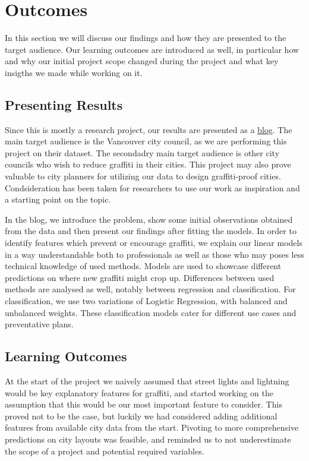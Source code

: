 \chapter{Outcomes}
In this section we will discuss our findings and how they are presented to the target audience. Our learning outcomes are introduced as well, in particular how and why our initial project scope changed during the project and what key insigths we made while working on it.

\section{Presenting Results}

Since this is mostly a research project, our results are presented as a \href{https://cowkeyman.github.io/PredictingGraffitiUsingCityLayouts/}{blog}. The main target audience is the Vancouver city council, as we are performing this project on their dataset. The secondadry main target audience is other city councils who wish to reduce graffiti in their cities. This project may also prove valuable to city planners for utilizing our data to design graffiti-proof cities. Condsideration has been taken for researchers to use our work as inspiration and a starting point on the topic.

In the blog, we introduce the problem, show some initial observations obtained from the data and then present our findings after fitting the models. In order to identify features which prevent or encourage graffiti, we explain our linear models in a way understandable both to professionals as well as those who may poses less technical knowledge of used methods. Models are used to showcase different predictions on where new graffiti might crop up. Differences between used methods are analysed as well, notably between regression and classification. For classification, we use two variations of Logistic Regression, with balanced and unbalanced weights. These classification models cater for different use cases and preventative plans.

\section{Learning Outcomes} %
At the start of the project we naively assumed that street lights and lightning would be key explanatory features for graffiti, and started working on the assumption that this would be our most important feature to consider. This proved not to be the case, but luckily we had considered adding additional features from available city data from the start. Pivoting to more comprehensive predictions on city layouts was feasible, and reminded us to not underestimate the scope of a project and potential required variables.

